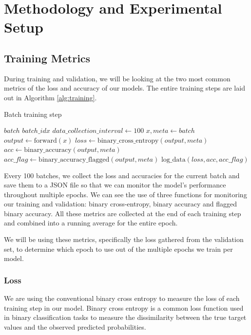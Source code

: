 \chapter{Methodology and Experimental Setup}

\section{Training Metrics}

During training and validation, we will be looking at the two most common metrics of the loss and accuracy of our models. The entire training steps are laid out in Algorithm \ref{alg:training}.

\begin{algorithm}[H]
    \caption{Batch training step}
    \begin{algorithmic}[1]
        \Require $batch$
        \Require $batch\_idx$
        \State $data\_collection\_interval \gets 100$
        \State $x, meta \gets batch$
        \State $output \gets \text{forward}(x)$
        \State $loss \gets \text{binary\_cross\_entropy}(output, meta)$
        \State $acc \gets \text{binary\_accuracy}(output, meta)$
        \State $acc\_flag \gets \text{binary\_accuracy\_flagged}(output, meta)$
        \State $\text{log\_data}(loss, acc, acc\_flag)$
        \EndIf
    \end{algorithmic}
    \label{alg:training}
\end{algorithm}

Every 100 batches, we collect the loss and accuracies for the current batch and save them to a JSON file so that we can monitor the model's performance throughout multiple epochs. We can see the use of three functions for monitoring our training and validation: binary cross-entropy, binary accuracy and flagged binary accuracy. All these metrics are collected at the end of each training step and combined into a running average for the entire epoch.

We will be using these metrics, specifically the loss gathered from the validation set, to determine which epoch to use out of the multiple epochs we train per model.

\subsection{Loss}

We are using the conventional binary cross entropy to measure the loss of each training step in our model. Binary cross entropy is a common loss function used in binary classification tasks to measure the dissimilarity between the true target values and the observed predicted probabilities.

